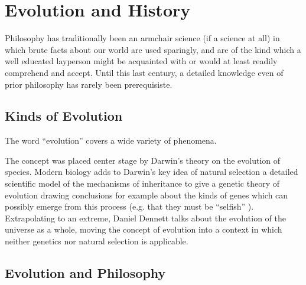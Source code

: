 \chapter{Evolution and History}\label{Evolution}

Philosophy has traditionally been an armchair science (if a science at all) in which brute facts about our world are used sparingly, and are of the kind which a well educated layperson might be acquainted with or would at least readily comprehend and accept.
Until this last century, a detailed knowledge even of prior philosophy has rarely been prerequisiste.

\section{Kinds of Evolution}

The word ``evolution'' covers a wide variety of phenomena.

The concept was placed center stage by Darwin's theory on the evolution of species.
Modern biology adds to Darwin's key idea of natural selection a detailed scientific model of the mechanisms of inheritance to give a genetic theory of evolution drawing conclusions for example about the kinds of genes which can possibly emerge from this process (e.g. that they must be ``selfish'' \cite{dawkinsSG}).
Extrapolating to an extreme, Daniel Dennett \cite{dennettDDI} talks about the evolution of the universe as a whole, moving the concept of evolution into a context in which neither genetics nor natural selection is applicable.

\section{Evolution and Philosophy}



